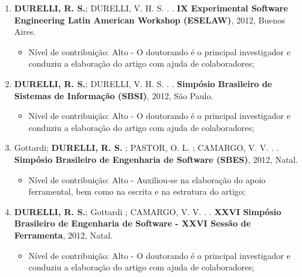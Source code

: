 \begin{itemize}
\begin{enumerate}
	    \item \textbf{DURELLI, R. S.}; DURELLI, V. H. S. . . \textbf{IX Experimental Software Engineering Latin American Workshop (ESELAW)}, 2012, Buenos Aires.
	            \begin{itemize}
			        \item Nível de contribuição: Alto - O doutorando é o principal investigador e conduziu a elaboração do artigo com ajuda de colaboradores;
			    \end{itemize}
	 	
	 	\item \textbf{DURELLI, R. S.}; DURELLI, V. H. S. . . \textbf{Simpósio Brasileiro de Sistemas de Informação (SBSI)}, 2012, São Paulo.
	 	        \begin{itemize}
			        \item Nível de contribuição: Alto - O doutorando é o principal investigador e conduziu a elaboração do artigo com ajuda de colaboradores;
			    \end{itemize}
	 	
	 	
	 	\item Gottardi; \textbf{DURELLI, R. S.} ; PASTOR, O. L. ; CAMARGO, V. V. . . \textbf{Simpósio Brasileiro de Engenharia de Software (SBES)}, 2012, Natal.
	 	     \begin{itemize}
			        \item Nível de contribuição: Alto - Auxiliou-se na elaboração do apoio ferramental, bem como na escrita e na estrutura do artigo;
			    \end{itemize}
	 	
	 	\item \textbf{DURELLI, R. S.}; Gottardi ; CAMARGO, V. V. . . \textbf{XXVI Simpósio Brasileiro de Engenharia de Software - XXVI Sessão de Ferramenta}, 2012, Natal.
	 	       \begin{itemize}
			        \item Nível de contribuição: Alto - O doutorando é o principal investigador e conduziu a elaboração do artigo com ajuda de colaboradores;
			   \end{itemize}
	 	

\end{enumerate}
\end{itemize}
